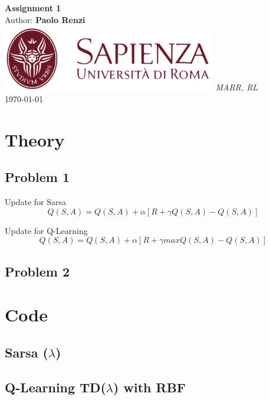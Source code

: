 \documentclass[10pt,a4paper]{article}
\begin{document}
\begin{titlepage}
    \begin{center}
        \vspace*{1cm}
        \Huge\textbf{Assignment 1}\\
        \vspace{1.5cm}
        \Large Author:
        \textbf{Paolo Renzi}\\
        \vspace{0.5cm}
        \vfill
        \includegraphics[width=0.7\textwidth]{images/sapienza_logo.png}
        \vfill
        \vspace{0.8cm}
        \Large \textit{MARR, RL}\\
        \today
    \end{center}
\end{titlepage}
\newpage

\section*{Theory}
\subsection*{Problem 1}
Update for Sarsa 
\begin{equation}
    Q(S, A) = Q(S, A) + \alpha [R +\gamma Q(S, A)- Q(S, A)]
\end{equation}


Update for Q-Learning
\begin{equation}
    Q(S, A) = Q(S, A) + \alpha [R +\gamma max Q(S, A)- Q(S, A)]
\end{equation}




\newpage
\subsection*{Problem 2}


\newpage
\section*{Code}

\subsection*{Sarsa ($\lambda$) }

\subsection*{Q-Learning TD($\lambda$) with RBF}
\end{document}
